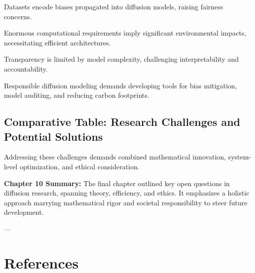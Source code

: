 Datasets encode biases propagated into diffusion models, raising fairness concerns.

Enormous computational requirements imply significant environmental impacts, necessitating efficient architectures.

Transparency is limited by model complexity, challenging interpretability and accountability.

Responsible diffusion modeling demands developing tools for bias mitigation, model auditing, and reducing carbon footprints.

\section{Comparative Table: Research Challenges and Potential Solutions}

\begin{table}[h]
\centering
{}
\caption{Summary of Open Challenges and Research Directions}
\end{table}

Addressing these challenges demands combined mathematical innovation, system-level optimization, and ethical consideration.

\textbf{Chapter 10 Summary:}  
The final chapter outlined key open questions in diffusion research, spanning theory, efficiency, and ethics. It emphasizes a holistic approach marrying mathematical rigor and societal responsibility to steer future development.

---

\chapter*{References}

